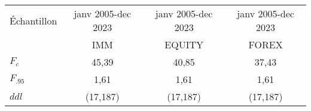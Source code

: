 \begin{tabular}{lccc}
\toprule
Échantillon & janv 2005-dec 2023 & janv 2005-dec 2023 & janv 2005-dec 2023 \\
      &  IMM &  EQUITY & FOREX \\  
\cmidrule(r){1-1} \cmidrule(lr){2-2}\cmidrule(l){3-3} \cmidrule(l){4-4}
    $F_c$        &  45,39     &  40,85 & 37,43    \\
    $F_{.95}$    & 1,61    &  1,61    &  1,61 \\
    $ddl$        & (17,187)     &  (17,187) & (17,187)      \\ 
\bottomrule
\end{tabular}